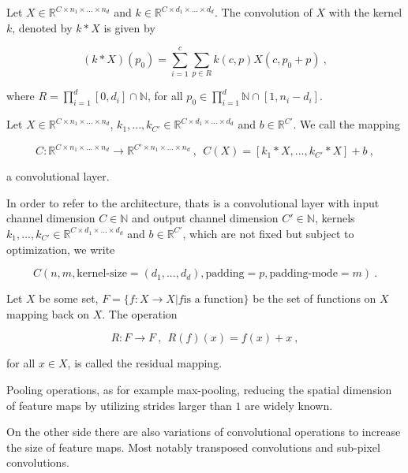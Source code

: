 \begin{definition}

    Let $X \in \mathbb R^{C \times n_1 \times ... \times n_d}$ and $k \in \mathbb R^{C \times d_1 \times ... \times d_d}$.
    The convolution of $X$ with the kernel $k$, denoted by $k * X$ is given by
    
        $$(k * X)(p_{0}) = \sum_{i=1}^c \sum_{p \in R} k(c, p) X(c, p_{0} + p) ~,$$

    where $R = \prod_{i=1}^d [0, d_i] \cap \mathbb N$, for all $p_0 \in \prod_{i=1}^{d} \mathbb{N} \cap [1, n_i - d_i]$.

\end{definition}

\begin{definition}
    Let $X \in \mathbb R^{C \times n_1 \times ... \times n_d}$, $k_1, ..., k_{C'} \in \mathbb R^{C \times d_1 \times ... \times d_d}$ and $b \in \mathbb R^{C'}$.
    We call the mapping 

        $$ C : \mathbb R^{C \times n_1 \times ... \times n_d} \to \mathbb R^{C' \times n_1 \times ... \times n_d} ~, ~~
        C(X) = [k_1 * X, ..., k_{C'} * X] + b ~, $$

    a convolutional layer.
\end{definition}

In order to refer to the architecture,
thats is a convolutional layer with input channel dimension $C \in \mathbb N$ and output channel dimension $C' \in \mathbb N$,
kernels $k_1, ..., k_{C'} \in \mathbb R^{C \times d_1 \times ... \times d_d}$ and $b \in \mathbb R^{C'}$,
which are not fixed but subject to optimization, 
we write 

    $$C(n, m, \text{kernel-size}=(d_1, ..., d_d), \text{padding}=p, \text{padding-mode}=m) ~.$$

\begin{definition}
    Let $X$ be some set, $F = \{f : X \to X | f \text{is a function} \}$ be the set of functions on $X$ mapping back on $X$.
    The operation
    
        $$ R : F \to F ~, ~~ R(f)(x) = f(x) + x ~, $$

    for all $x \in X$, is called the residual mapping.
\end{definition}

Pooling operations, as for example max-pooling, 
reducing the spatial dimension of feature maps by utilizing strides larger than $1$ are widely known.

On the other side there are also variations of convolutional operations to increase the size of feature maps.
Most notably transposed convolutions and sub-pixel convolutions.

